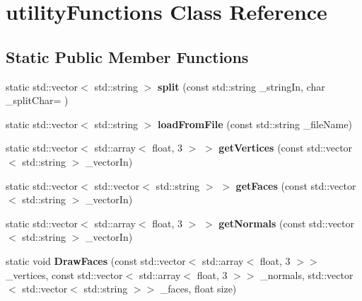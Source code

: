 \hypertarget{classutilityFunctions}{}\section{utility\+Functions Class Reference}
\label{classutilityFunctions}
\subsection*{Static Public Member Functions}
\begin{DoxyCompactItemize}
\item 
static std\+::vector$<$ std\+::string $>$ {\bfseries split} (const std\+::string \+\_\+string\+In, char \+\_\+split\+Char= \textquotesingle{} \textquotesingle{})\hypertarget{classutilityFunctions_a8d92ce117b8496eb26f975bb363228a0}{}\label{classutilityFunctions_a8d92ce117b8496eb26f975bb363228a0}

\item 
static std\+::vector$<$ std\+::string $>$ {\bfseries load\+From\+File} (const std\+::string \+\_\+file\+Name)\hypertarget{classutilityFunctions_a2f3dae0b035b1d4102c60a0328f574f2}{}\label{classutilityFunctions_a2f3dae0b035b1d4102c60a0328f574f2}

\item 
static std\+::vector$<$ std\+::array$<$ float, 3 $>$ $>$ {\bfseries get\+Vertices} (const std\+::vector$<$ std\+::string $>$ \+\_\+vector\+In)\hypertarget{classutilityFunctions_a87adf8e3dc58c0bf025aca153d988dda}{}\label{classutilityFunctions_a87adf8e3dc58c0bf025aca153d988dda}

\item 
static std\+::vector$<$ std\+::vector$<$ std\+::string $>$ $>$ {\bfseries get\+Faces} (const std\+::vector$<$ std\+::string $>$ \+\_\+vector\+In)\hypertarget{classutilityFunctions_add78b90c4c370f78955105b5ffe54ef7}{}\label{classutilityFunctions_add78b90c4c370f78955105b5ffe54ef7}

\item 
static std\+::vector$<$ std\+::array$<$ float, 3 $>$ $>$ {\bfseries get\+Normals} (const std\+::vector$<$ std\+::string $>$ \+\_\+vector\+In)\hypertarget{classutilityFunctions_a7f95611addb4e48faa286444cb22dec4}{}\label{classutilityFunctions_a7f95611addb4e48faa286444cb22dec4}

\item 
static void {\bfseries Draw\+Faces} (const std\+::vector$<$ std\+::array$<$ float, 3 $>$$>$ \+\_\+vertices, const std\+::vector$<$ std\+::array$<$ float, 3 $>$$>$ \+\_\+normals, std\+::vector$<$ std\+::vector$<$ std\+::string $>$$>$ \+\_\+faces, float size)\hypertarget{classutilityFunctions_acaa221ca126ccbf2aa9edf1fc4fc670c}{}\label{classutilityFunctions_acaa221ca126ccbf2aa9edf1fc4fc670c}


\end{DoxyCompactItemize}

